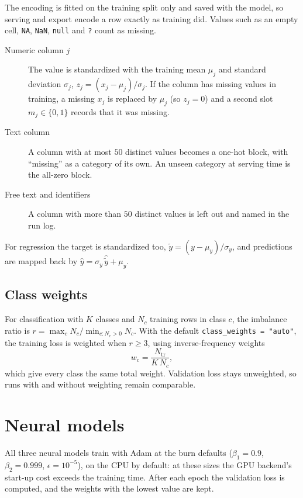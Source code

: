 \documentclass[11pt]{article}
\theoremstyle{plain}
\theoremstyle{definition}
\newcommand{\code}[1]{\texttt{#1}}
\begin{document}
The encoding is fitted on the training split only and saved with the model, so
serving and export encode a row exactly as training did. Values such as an
empty cell, \code{NA}, \code{NaN}, \code{null} and \code{?} count as missing.
\begin{description}
  \item[Numeric column $j$] The value is standardized with the training mean
        $\mu_j$ and standard deviation $\sigma_j$,
        $z_j = (x_j - \mu_j)/\sigma_j$. If the column has missing values in
        training, a missing $x_j$ is replaced by $\mu_j$ (so $z_j = 0$) and a
        second slot $m_j \in \{0, 1\}$ records that it was missing.
  \item[Text column] A column with at most $50$ distinct values becomes a
        one-hot block, with \enquote{missing} as a category of its own. An
        unseen category at serving time is the all-zero block.
  \item[Free text and identifiers] A column with more than $50$ distinct
        values is left out and named in the run log.
\end{description}
For regression the target is standardized too,
$\tilde{y} = (y - \mu_y)/\sigma_y$, and predictions are mapped back by
$\hat{y} = \sigma_y\,\hat{\tilde{y}} + \mu_y$.

\subsection{Class weights}

For classification with $K$ classes and $N_c$ training rows in class $c$,
the imbalance ratio is $r = \max_c N_c / \min_{c : N_c > 0} N_c$. With the
default \code{class\_weights = "auto"}, the training loss is weighted when
$r \ge 3$, using inverse-frequency weights
\begin{equation}\label{eq:weights}
  w_c = \frac{N_{\text{tr}}}{K\,N_c},
\end{equation}
which give every class the same total weight. Validation loss stays
unweighted, so runs with and without weighting remain comparable.

\section{Neural models}\label{sec:neural}

All three neural models train with Adam at the burn defaults
($\beta_1 = 0.9$, $\beta_2 = 0.999$, $\epsilon = 10^{-5}$), on the CPU by
default: at these sizes the GPU backend's start-up cost exceeds the training
time. After each epoch the validation loss is computed, and the weights with
the lowest value are kept.
\end{document}
